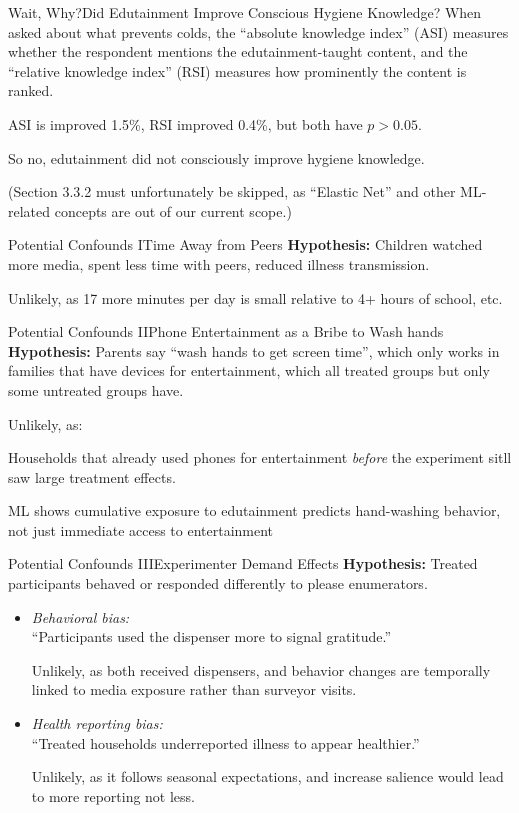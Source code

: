 \documentclass[aspectratio=169]{beamer}
\begin{document}
\begin{frame}{Wait, Why?}{Did Edutainment Improve Conscious Hygiene Knowledge?}
	When asked about what prevents colds, the ``absolute knowledge index''
	(ASI) measures whether the respondent mentions the edutainment-taught
	content, and the ``relative knowledge index'' (RSI) measures how
	prominently the content is ranked.

	ASI is improved 1.5\%, RSI improved 0.4\%, but both have $p > 0.05$.

	So no, edutainment did not consciously improve hygiene knowledge.
	
	\footnotesize (Section 3.3.2 must unfortunately be skipped, as ``Elastic Net'' and
	other ML-related concepts are out of our current scope.)
\end{frame}

\begin{frame}{Potential Confounds I}{Time Away from Peers}
	\textbf{Hypothesis:} Children watched more media, spent less time with peers, reduced illness transmission.

	Unlikely, as 17 more minutes per day is small relative to 4+ hours of school, etc.
\end{frame}

\begin{frame}{Potential Confounds II}{Phone Entertainment as a Bribe to Wash hands}
	\textbf{Hypothesis:} Parents say ``wash hands to get screen time'', which only works in families that have devices for entertainment, which all treated groups but only some untreated groups have.

	Unlikely, as:

	Households that already used phones for entertainment \emph{before} the
	experiment sitll saw large treatment effects.

	ML shows cumulative exposure to edutainment predicts hand-washing
	behavior, not just immediate access to entertainment
\end{frame}

\begin{frame}{Potential Confounds III}{Experimenter Demand Effects}
	\textbf{Hypothesis:} Treated participants behaved or responded differently to please enumerators.

	\begin{itemize}
		\item \textit{Behavioral bias:}\\``Participants used the dispenser more to signal gratitude.''

			Unlikely, as both received dispensers, and behavior changes are temporally linked to media exposure rather than surveyor visits.

		\item \textit{Health reporting bias:}\\``Treated households underreported illness to appear healthier.''

			Unlikely, as it follows seasonal expectations, and increase salience would lead to more reporting not less.
	\end{itemize}
\end{frame}
\end{document}
